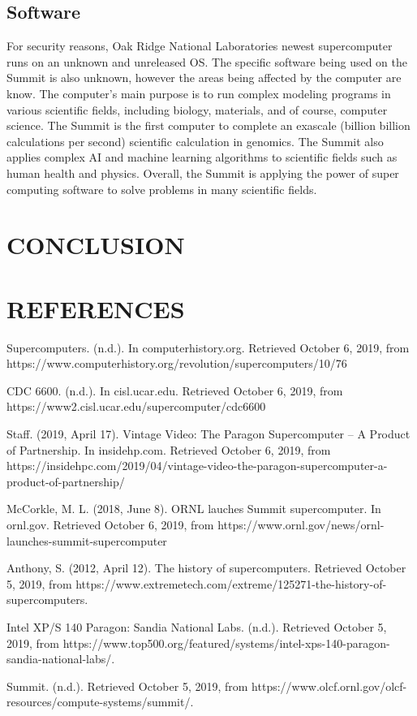\documentclass[letterpaper, 10 pt, conference]{IEEEconf}
\begin{document}
\subsection{Software}
For security reasons, Oak Ridge National Laboratories newest
supercomputer runs on an unknown and unreleased OS. The specific
software being used on the Summit is also unknown, however the
areas being affected by the computer are know. The computer's main
purpose is to run complex modeling programs in various scientific
fields, including biology, materials, and of course, computer
science. The Summit is the first computer to complete an exascale
(billion billion calculations per second) scientific calculation
in genomics. The Summit also applies complex AI and machine
learning algorithms to scientific fields such as human health and
physics. Overall, the Summit is applying the power of super
computing software to solve problems in many scientific fields.


\section{CONCLUSION}


\section*{REFERENCES}

\begin{enumerate}[label={[\arabic*]}]
\item Supercomputers. (n.d.). In computerhistory.org. Retrieved October 6, 2019, from https://www.computerhistory.org/revolution/supercomputers/10/76
\item CDC 6600. (n.d.). In cisl.ucar.edu. Retrieved October 6, 2019, from https://www2.cisl.ucar.edu/supercomputer/cdc6600
\item Staff. (2019, April 17). Vintage Video: The Paragon Supercomputer – A Product of Partnership. In insidehp.com. Retrieved October 6, 2019, from https://insidehpc.com/2019/04/vintage-video-the-paragon-supercomputer-a-product-of-partnership/
\item McCorkle, M. L. (2018, June 8). ORNL lauches Summit supercomputer. In ornl.gov. Retrieved October 6, 2019, from https://www.ornl.gov/news/ornl-launches-summit-supercomputer
\item Anthony, S. (2012, April 12). The history of supercomputers. Retrieved October 5, 2019, from https://www.extremetech.com/extreme/125271-the-history-of-supercomputers.
\item Intel XP/S 140 Paragon: Sandia National Labs. (n.d.). Retrieved October 5, 2019, from https://www.top500.org/featured/systems/intel-xps-140-paragon-sandia-national-labs/.
\item Summit. (n.d.). Retrieved October 5, 2019, from https://www.olcf.ornl.gov/olcf-resources/compute-systems/summit/.
\end{enumerate}
\end{document}
